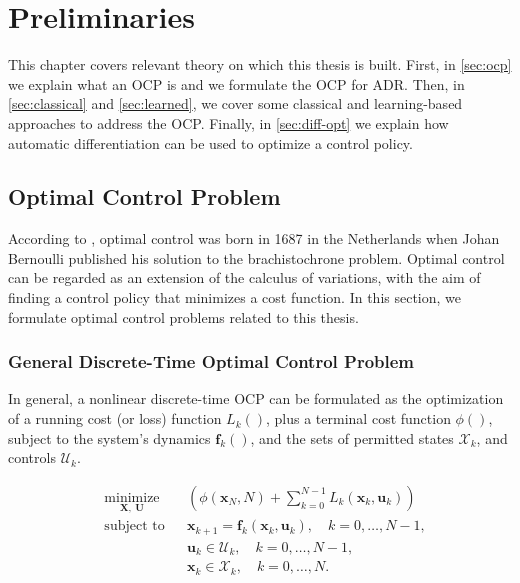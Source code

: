 
\chapter{Preliminaries }\label{pre}
This chapter covers relevant theory on which this thesis is built.
First, in \autoref{sec:ocp} we explain what an \ac{OCP} is and we formulate the \ac{OCP} for \ac{ADR}.
Then, in \autoref{sec:classical} and \autoref{sec:learned}, we cover some classical and learning-based approaches to address the \ac{OCP}.
Finally, in \autoref{sec:diff-opt} we explain how automatic differentiation can be used to optimize a control policy.

\section{Optimal Control Problem} \label{sec:ocp} 
According to \cite{sussmann_300_1997}, optimal control was born in 1687 in the Netherlands when Johan Bernoulli published his solution to the brachistochrone problem.
Optimal control can be regarded as an extension of the calculus of variations, with the aim of finding a control policy that minimizes a cost function.
In this section, we formulate optimal control problems related to this thesis.


\subsection{General Discrete-Time Optimal Control Problem}
In general, a nonlinear discrete-time \ac{OCP} can be formulated as the optimization of a running cost (or loss) function $L_{k}()$, plus a terminal cost function $\phi()$, subject to the system's dynamics $\mathbf{f}_k()$, and the sets of permitted states $\mathcal{X}_k$, and controls $\mathcal{U}_k$.


\begin{equation}
\begin{aligned}
& \underset{\mathbf{X},\ \mathbf{U}}{\text{minimize}} & & \left( \phi(\boldsymbol{x}_{N}, N) + \sum_{k=0}^{N-1} L_{k}(\boldsymbol{x}_{k}, \boldsymbol{u}_{k}) \right) \\
& \text{subject to} & & \boldsymbol{x}_{k+1} = \mathbf{f}_{k}(\boldsymbol{x}_{k}, \boldsymbol{u}_{k}), \quad k = 0, \dots, N-1, \\
& & & \boldsymbol{u}_{k} \in \mathcal{U}_{k}, \quad k = 0, \dots, N-1, \\
& & & \boldsymbol{x}_{k} \in \mathcal{X}_{k}, \quad k = 0, \dots, N.
\end{aligned}
\end{equation}


